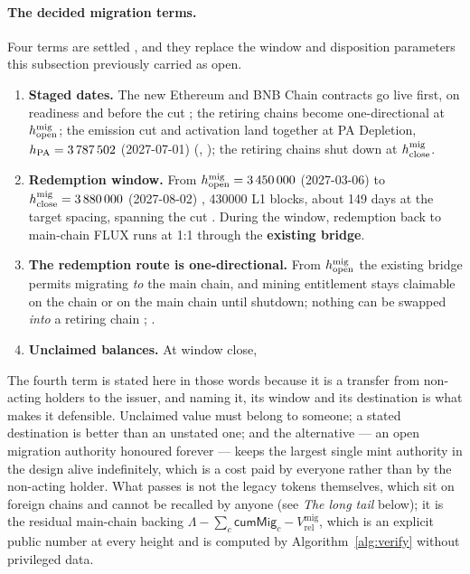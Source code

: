 \paragraph{The decided migration terms.} Four terms are settled
, and they replace the window and disposition
parameters this subsection previously carried as open. \planned

\begin{enumerate}
\item \textbf{Staged dates.} The new Ethereum and BNB Chain contracts go live first, on readiness and
      before the cut ; the retiring chains become
      one-directional at $h^{\mathrm{mig}}_{\mathrm{open}}$; the emission cut and \PNR activation land together at PA Depletion,
      $h_{\mathrm{PA}} = \num{3787502}$ (2027-07-01) (, ); the retiring
      chains shut down at $h^{\mathrm{mig}}_{\mathrm{close}}$.
\item \textbf{Redemption window.} From $h^{\mathrm{mig}}_{\mathrm{open}} = \num{3450000}$ (2027-03-06) to
      $h^{\mathrm{mig}}_{\mathrm{close}} = \num{3880000}$ (2027-08-02) ,
      \num{430000} L1 blocks, about \num{149} days at the \PoN target
      spacing, spanning the cut \srcinferred. During the window, redemption back to main-chain FLUX
      runs at 1:1 through the \textbf{existing bridge}.
\item \textbf{The redemption route is one-directional.} From $h^{\mathrm{mig}}_{\mathrm{open}}$ the existing bridge permits
      migrating \emph{to} the main chain, and mining entitlement stays claimable on the chain or on
      the main chain until shutdown; nothing can be swapped \emph{into} a retiring chain
      ; .
\item \textbf{Unclaimed balances.} At window close, 
\end{enumerate}

\noindent The fourth term is stated here in those words because it is a transfer from non-acting
holders to the issuer, and naming it, its window and its destination is what makes it defensible.
Unclaimed value must belong to someone; a stated destination is better than an unstated one; and the
alternative --- an open migration authority honoured forever --- keeps the largest single mint
authority in the design alive indefinitely, which is a cost paid by everyone rather than by the
non-acting holder. What passes is not the legacy tokens themselves, which sit on foreign chains and
cannot be recalled by anyone (see \emph{The long tail} below); it is the residual main-chain backing
$\Lambda - \sum_c \mathsf{cumMig}_c - V^{\mathrm{mig}}_{\mathrm{rel}}$, which is an explicit public
number at every height and is computed by Algorithm~\ref{alg:verify} without privileged data.

